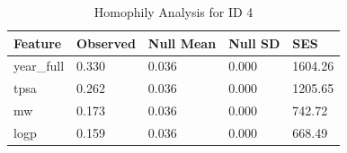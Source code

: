 \begin{table}
\caption{Homophily Analysis for ID 4}
\label{tab:homophily_id4}
\begin{tabular}{lllll}
\toprule
Feature & Observed & Null Mean & Null SD & SES \\
\midrule
year_full & 0.330 & 0.036 & 0.000 & 1604.26 \\
tpsa & 0.262 & 0.036 & 0.000 & 1205.65 \\
mw & 0.173 & 0.036 & 0.000 & 742.72 \\
logp & 0.159 & 0.036 & 0.000 & 668.49 \\
\bottomrule
\end{tabular}
\end{table}
